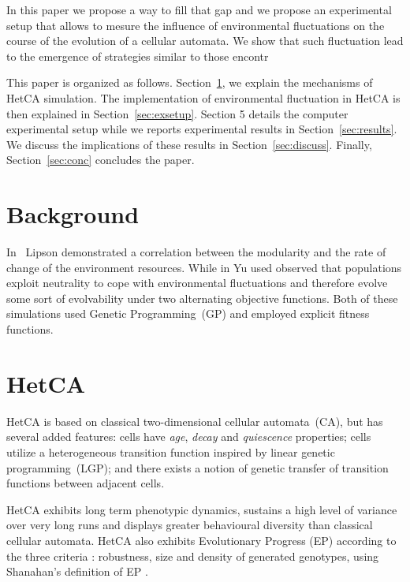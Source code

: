 \documentclass[letterpaper]{article}
\begin{document}
In this paper we propose a way to fill that gap and we propose an experimental setup that allows to mesure the influence of environmental fluctuations on the course of the evolution of a cellular automata. We show that such fluctuation lead to the emergence of strategies similar to those encontr

This paper is organized as follows. Section~\ref{sec:bground}, we explain the mechanisms of HetCA simulation. The implementation of environmental fluctuation in HetCA is then explained in Section~\ref{sec:exsetup}. Section 5 details the computer experimental setup while we reports experimental results in Section~\ref{sec:results}. We discuss the implications of these results in Section~\ref{sec:discuss}. Finally, Section~\ref{sec:conc} concludes the paper.


\section{Background}\label{sec:bground}
In~\citep{lipson2002origin} Lipson demonstrated a correlation between the modularity and the rate of change of the environment resources. While in \citep{yu2007program} Yu used observed that populations exploit neutrality to cope with environmental fluctuations and therefore evolve some sort of evolvability under two alternating objective functions. Both of these simulations used Genetic Programming~(GP) and employed explicit fitness functions.

\section{HetCA}\label{sec:hetca)}
HetCA is based on classical two-dimensional cellular automata~(CA), but has several added features: cells have \emph{age}, \emph{decay} and \emph{quiescence} properties; cells utilize a heterogeneous transition function inspired by linear genetic programming~(LGP); and there exists a notion of genetic transfer of transition functions between adjacent cells.

HetCA exhibits long term phenotypic dynamics, sustains a high level of variance over very long runs and displays greater behavioural diversity than classical cellular automata\citep{medernach2013long}. HetCA also exhibits Evolutionary Progress (EP) according to the three criteria : robustness, size and density of generated genotypes\citep{medernach2015evolutionary}, using Shanahan's definition of EP \citep{shanahan2012evolutionary}.
\end{document}
